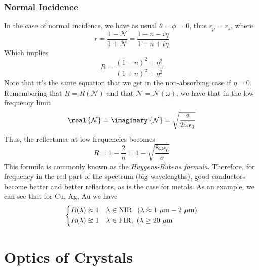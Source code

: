 \documentclass[../electromagnetism.tex]{subfiles}
\begin{document}
\subsection{Normal Incidence}
In the case of normal incidence, we have as usual $\theta=\phi=0$, thus $r_p=r_s$, where
\begin{equation}
	r=\frac{1-\mathcal{N}}{1+\mathcal{N}}=\frac{1-n-i\eta}{1+n+i\eta}
	\label{eq:rni.nra}
\end{equation}
Which implies
\begin{equation}
	R=\frac{(1-n)^2+\eta^2}{(1+n)^2+\eta^2}
	\label{eq:refni.nra}
\end{equation}
Note that it's the same equation that we get in the non-absorbing case if $\eta=0$.\\
Remembering that $R=R(\mathcal{N})$ and that $\mathcal{N}=\mathcal{N}(\omega)$, we have that in the low frequency limit
\begin{equation}
	\real\left\{ \mathcal{N} \right\}=\imaginary\left\{ \mathcal{N} \right\}=\sqrt{\frac{\sigma}{2\omega\epsilon_0}}
	\label{eq:lowfreqni.nra}
\end{equation}
Thus, the reflectance at low frequencies becomes
\begin{equation}
	R=1-\frac{2}{n}=1-\sqrt{\frac{8\omega\epsilon_0}{\sigma}}
	\label{eq:huygenrubens.nra}
\end{equation}
This formula is commonly known as the \textit{Huygens-Rubens formula}. Therefore, for frequency in the red part of the spectrum (big wavelengths), good conductors become better and better reflectors, as is the case for metals. As an example, we can see that for Cu, Ag, Au we have 
\begin{equation*}
	\begin{dcases}
		R(\lambda)\approx1&\lambda\in\mathrm{NIR},\ (\lambda\approx1\ \mu\mathrm{m}-2\ \mu\mathrm{m})\\
		R(\lambda)\approxeq1&\lambda\in\mathrm{FIR}, \ (\lambda\ge20\ \mu\mathrm{m}\\
	\end{dcases}
\end{equation*}
\chapter{Optics of Crystals}
\end{document}
